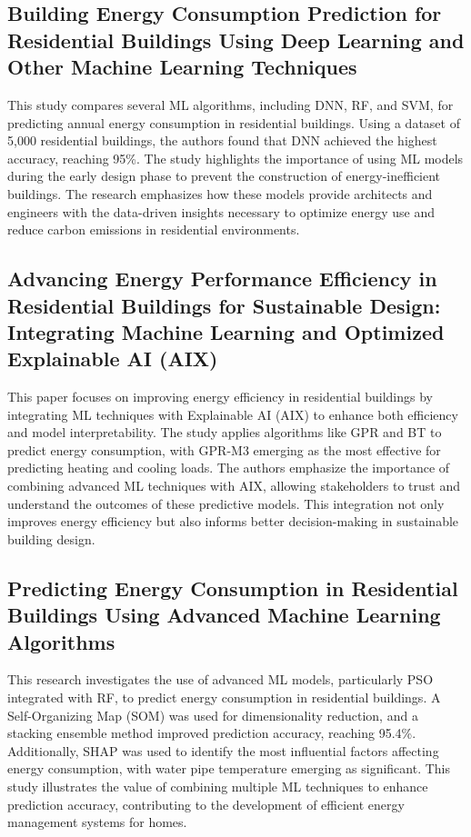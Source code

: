 \documentclass[a4paper, 12pt]{article}
\begin{document}
\subsection{Building Energy Consumption Prediction for Residential Buildings Using Deep Learning and Other Machine Learning Techniques}
\quad This study compares several ML algorithms, including DNN, RF, and SVM, for predicting annual energy consumption in residential buildings. Using a dataset of 5,000 residential buildings, the authors found that DNN achieved the highest accuracy, reaching 95\%. The study highlights the importance of using ML models during the early design phase to prevent the construction of energy-inefficient buildings. The research emphasizes how these models provide architects and engineers with the data-driven insights necessary to optimize energy use and reduce carbon emissions in residential environments. \cite{Olu22}
\vspace{7pt}

\subsection{Advancing Energy Performance Efficiency in Residential Buildings for Sustainable Design: Integrating Machine Learning and Optimized Explainable AI (AIX)}
\quad This paper focuses on improving energy efficiency in residential buildings by integrating ML techniques with Explainable AI (AIX) to enhance both efficiency and model interpretability. The study applies algorithms like GPR and BT to predict energy consumption, with GPR-M3 emerging as the most effective for predicting heating and cooling loads. The authors emphasize the importance of combining advanced ML techniques with AIX, allowing stakeholders to trust and understand the outcomes of these predictive models. This integration not only improves energy efficiency but also informs better decision-making in sustainable building design. \cite{Badr24}
\vspace{7pt}

\subsection{Predicting Energy Consumption in Residential Buildings Using Advanced Machine Learning Algorithms}
\quad This research investigates the use of advanced ML models, particularly PSO integrated with RF, to predict energy consumption in residential buildings. A Self-Organizing Map (SOM) was used for dimensionality reduction, and a stacking ensemble method improved prediction accuracy, reaching 95.4\%. Additionally, SHAP was used to identify the most influential factors affecting energy consumption, with water pipe temperature emerging as significant. This study illustrates the value of combining multiple ML techniques to enhance prediction accuracy, contributing to the development of efficient energy management systems for homes. \cite{Din23}
\vspace{7pt}
\end{document}
